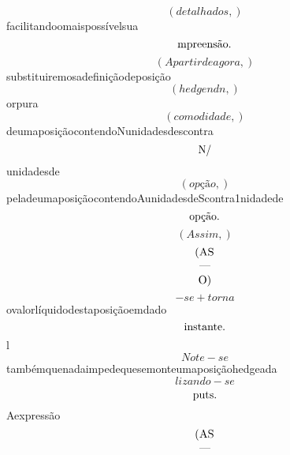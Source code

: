 \documentclass{article}
\begin{document}
\begin{equation}
\left( detalhados,\right)
\end{equation}facilitandoomaispossívelsua\begin{equation}
$mpreensão.$
\end{equation}\begin{equation}
\left( Apartirdeagora,\right)
\end{equation}substituiremosadefiniçãodeposição\begin{equation}
\left( hedgendn,\right)
\end{equation}orpura\begin{equation}
\left( comodidade,\right)
\end{equation}deumaposiçãocontendoNunidadesdescontra\begin{equation}
$N/$
\end{equation}unidadesde\begin{equation}
\left( opção,\right)
\end{equation}peladeumaposiçãocontendoAunidadesdeScontra1nidadede\begin{equation}
$opção.$
\end{equation}\begin{equation}
\left( Assim,\right)
\end{equation}\begin{equation}
$(AS$
\end{equation}\begin{equation}
—
\end{equation}\begin{equation}
$O)$
\end{equation}\begin{equation}
- se + torna
\end{equation}ovalorlíquidodestaposiçãoemdado\begin{equation}
$instante.$
\end{equation}l\begin{equation}
Note - se
\end{equation}tambémquenadaimpedequesemonteumaposiçãohedgeada\begin{equation}
lizando - se
\end{equation}\begin{equation}
$puts.$
\end{equation}Aexpressão\begin{equation}
$(AS$
\end{equation}\begin{equation}
—
\end{equation}\begin{equation}

\end{equation}
\end{document}
